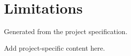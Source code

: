 \section{Limitations}
Generated from the project specification.

Add project-specific content here.

